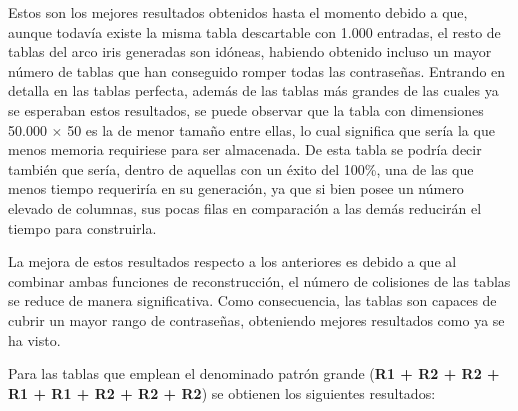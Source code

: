 \documentclass[12pt,spanish,listoffigures,listoftables]{tfgetsinf}
\begin{document}
Estos son los mejores resultados obtenidos hasta el momento debido a que, aunque todavía existe la misma tabla descartable con 1.000 entradas, el resto de tablas del arco iris generadas son idóneas, habiendo obtenido incluso un mayor número de tablas que han conseguido romper todas las contraseñas. Entrando en detalla en las tablas perfecta, además de las tablas más grandes de las cuales ya se esperaban estos resultados, se puede observar que la tabla con dimensiones 50.000 $\times$ 50 es la de menor tamaño entre ellas, lo cual significa que sería la que menos memoria requiriese para ser almacenada. De esta tabla se podría decir también que sería, dentro de aquellas con un éxito del 100\%, una de las que menos tiempo requeriría en su generación, ya que si bien posee un número elevado de columnas, sus pocas filas en comparación a las demás reducirán el tiempo para construirla.

La mejora de estos resultados respecto a los anteriores es debido a que al combinar ambas funciones de reconstrucción, el número de colisiones de las tablas se reduce de manera significativa. Como consecuencia, las tablas son capaces de cubrir un mayor rango de contraseñas, obteniendo mejores resultados como ya se ha visto.

Para las tablas que emplean el denominado patrón grande (\textbf{R1 + R2 + R2 + R1 + R1 + R2 + R2 + R2}) se obtienen los siguientes resultados:
\\
\\
\\
\end{document}
